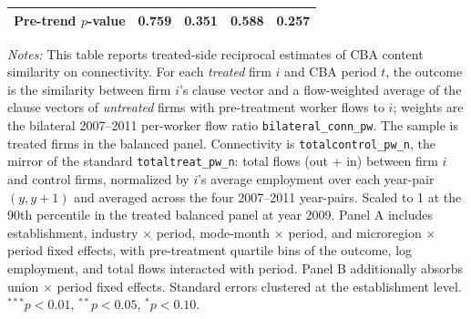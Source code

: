 \begin{table}[H]
\begin{tabular}{lcccc}
Pre-trend $p$-value & 0.759 & 0.351 & 0.588 & 0.257 \\
\bottomrule
\end{tabular}
\begin{minipage}{\linewidth}
\footnotesize\vspace{4pt}
\textit{Notes:} This table reports treated-side reciprocal estimates of CBA content similarity on connectivity. For each \emph{treated} firm $i$ and CBA period $t$, the outcome is the similarity between firm $i$'s clause vector and a flow-weighted average of the clause vectors of \emph{untreated} firms with pre-treatment worker flows to $i$; weights are the bilateral 2007--2011 per-worker flow ratio \texttt{bilateral\_conn\_pw}. The sample is treated firms in the balanced panel. Connectivity is \texttt{totalcontrol\_pw\_n}, the mirror of the standard \texttt{totaltreat\_pw\_n}: total flows (out + in) between firm $i$ and control firms, normalized by $i$'s average employment over each year-pair $(y, y+1)$ and averaged across the four 2007--2011 year-pairs. Scaled to 1 at the 90th percentile in the treated balanced panel at year 2009. Panel A includes establishment, industry $\times$ period, mode-month $\times$ period, and microregion $\times$ period fixed effects, with pre-treatment quartile bins of the outcome, log employment, and total flows interacted with period. Panel B additionally absorbs union $\times$ period fixed effects. Standard errors clustered at the establishment level. $^{***}p<0.01$, $^{**}p<0.05$, $^{*}p<0.10$.
\end{minipage}
\end{table}
